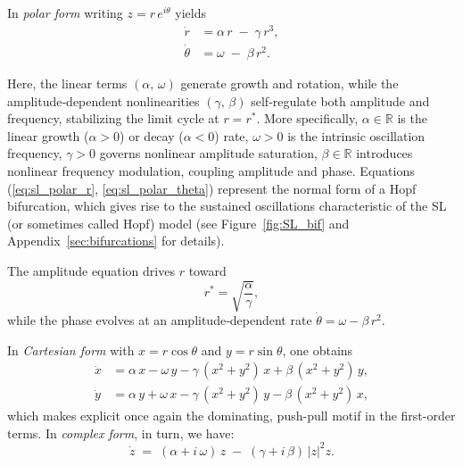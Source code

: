 \documentclass[12pt]{article}
\numberwithin{equation}{section}
\begin{document}
In \textit{polar form} writing \(z = r\,e^{i\theta}\) yields
\begin{align}
  \dot{r}      &= \alpha\,r \;-\; \gamma\,r^{3}, 
  \label{eq:sl_polar_r}\\
  \dot{\theta} &= \omega \;-\; \beta\,r^{2}.
  \label{eq:sl_polar_theta}
\end{align}

Here, the linear terms \((\alpha,\,\omega)\) generate growth and rotation, while the amplitude‐dependent nonlinearities \((\gamma,\,\beta)\) self‐regulate both amplitude and frequency, stabilizing the limit cycle at \(r=r^{*}\). More specifically, \(\alpha\in\mathbb{R}\) is the linear growth (\(\alpha>0\)) or decay (\(\alpha<0\)) rate, \(\omega>0\) is the intrinsic oscillation frequency, \(\gamma>0\) governs nonlinear amplitude saturation, \(\beta\in\mathbb{R}\) introduces nonlinear frequency modulation, coupling amplitude and phase. Equations (\eqref{eq:sl_polar_r}, \eqref{eq:sl_polar_theta}) represent the normal form of a Hopf bifurcation\cite{kuznecovElementsAppliedBifurcation1995}, which gives rise to the sustained oscillations characteristic of the SL (or sometimes called Hopf) model (see Figure~\ref{fig:SL_bif} and Appendix~\ref{sec:bifurcations} for details).

The amplitude equation drives \(r\) toward
\begin{equation}
  r^{*} = \sqrt{\frac{\alpha}{\gamma}},
\end{equation}
while the phase evolves at an amplitude‐dependent rate \( \dot\theta = \omega - \beta\,r^{2}\).

In \textit{Cartesian form}
with \(x = r\cos\theta\) and \(y = r\sin\theta\), one obtains
\begin{align}
  \dot{x} &= \alpha\,x - \omega\,y
           - \gamma\,(x^{2}+y^{2})\,x
           + \beta\,(x^{2}+y^{2})\,y,
  \label{eq:sl_cart_x}\\
  \dot{y} &= \alpha\,y + \omega\,x
           - \gamma\,(x^{2}+y^{2})\,y
           - \beta\,(x^{2}+y^{2})\,x,
  \label{eq:sl_cart_y}
\end{align}
which makes explicit once again the dominating,  push-pull motif in the first-order terms.
In \textit{complex form}, in turn, we have:
\begin{equation}
\dot{z} \;=\; (\alpha + i\,\omega)\,z \;-\; (\gamma + i\,\beta)\,\lvert z\rvert^{2}z.
\end{equation}
\end{document}
